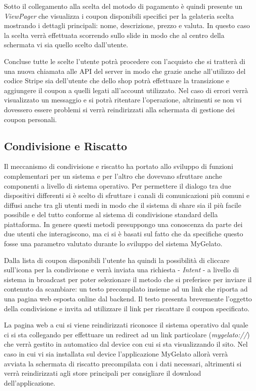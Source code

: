 Sotto il collegamento alla scelta del motodo di pagamento è quindi
presente un \emph{ViewPager} che visualizza i coupon disponibili specifici
per la gelateria scelta mostrando i dettagli principali: nome, descrizione,
prezzo e valuta. In questo caso la scelta verrà effettuata scorrendo
sullo slide in modo che al centro della schermata vi sia quello scelto
dall'utente.

Concluse tutte le scelte l'utente potrà procedere con l'acquisto che
si tratterà di una nuova chiamata alle API del server in modo che
grazie anche all'utilizzo del codice Stripe sia dell'utente che dello
shop potrà effettuare la transizione e aggiungere il coupon a quelli
legati all'account utilizzato. Nel caso di errori verrà visualizzato
un messaggio e si potrà ritentare l'operazione, altrimenti se non
vi dovessero essere problemi si verrà reindirizzati alla schermata
di gestione dei coupon personali.

\subsection{Condivisione e Riscatto}

Il meccanismo di condivisione e riscatto ha portato allo sviluppo
di funzioni complementari per un sistema e per l'altro che dovevano
sfruttare anche componenti a livello di sistema operativo. Per permettere
il dialogo tra due dispositivi differenti si è scelto di sfruttare
i canali di comunicazioni più comuni e diffusi anche tra gli utenti
medi in modo che il sistema di share sia il più facile possibile e
del tutto conforme al sistema di condivisione standard della piattaforma.
In genere questi metodi presuppongo una conoscenza da parte dei due
utenti che interagiscono, ma ci si è basati sul fatto che da specifiche
questo fosse una parametro valutato durante lo sviluppo del sistema
MyGelato.

Dalla lista di coupon disponibili l'utente ha quindi la possibilità
di cliccare sull'icona per la condivisone e verrà inviata una richiesta
- \emph{Intent} - a livello di sistema in broadcast per poter selezionare
il metodo che si preferisce per inviare il contenuto da scambiare:
un testo precompilato insieme ad un link che riporta ad una pagina
web esposta online dal backend. Il testo presenta brevemente l'oggetto
della condivisione e invita ad utilizzare il link per riscattare il
coupon specificato.

La pagina web a cui si viene reindirizzati riconosce il sistema operativo
dal quale ci si sta collegando per effettuare un redirect ad un link
particolare (\emph{mygelato://}) che verrà gestito in automatico dal
device con cui si sta visualizzando il sito. Nel caso in cui vi sia
installata sul device l'applicazione MyGelato allorà verrà avviata
la schermata di riscatto precompilata con i dati necessari, altrimenti
si verrà reindirizzati agli store principali per consigliare il download
dell'applicazione.

